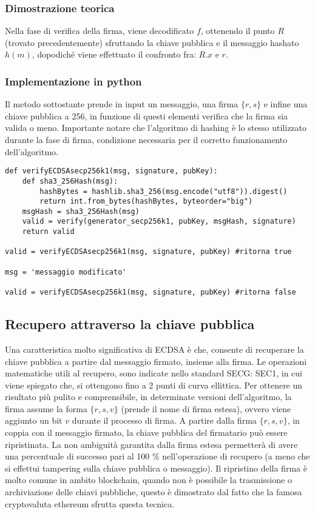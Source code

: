 \subsubsection{Dimostrazione teorica}

Nella fase di verifica della firma, viene decodificato $f$, ottenendo il punto $R$ (trovato precedentemente) sfruttando la chiave pubblica e il messaggio hashato $h(m)$, dopodiché viene effettuato il confronto fra: $R.x$ e $r$. 

\subsubsection{Implementazione in python}

Il metodo sottostante prende in input un messaggio, una firma $\{r, s\}$ e infine una chiave pubblica a 256, in funzione di questi elementi verifica che la firma sia valida o meno. Importante notare che l'algoritmo di hashing è lo stesso utilizzato durante la fase di firma, condizione necessaria per il corretto funzionamento dell'algoritmo.

\begin{lstlisting}
def verifyECDSAsecp256k1(msg, signature, pubKey):
	def sha3_256Hash(msg):
		hashBytes = hashlib.sha3_256(msg.encode("utf8")).digest()
		return int.from_bytes(hashBytes, byteorder="big")
	msgHash = sha3_256Hash(msg)
	valid = verify(generator_secp256k1, pubKey, msgHash, signature)
	return valid
	
valid = verifyECDSAsecp256k1(msg, signature, pubKey) #ritorna true

msg = 'messaggio modificato'

valid = verifyECDSAsecp256k1(msg, signature, pubKey) #ritorna false
\end{lstlisting}

\newpage

\subsection{Recupero attraverso la chiave pubblica}

Una caratteristica molto significativa di ECDSA è che, consente di recuperare la chiave pubblica a partire dal messaggio firmato, insieme alla firma. Le operazioni matematiche utili al recupero, sono indicate nello standard SECG: SEC1, in cui viene spiegato che, si ottengono fino a 2 punti di curva ellittica. Per ottenere un risultato più pulito e comprensibile, in determinate versioni dell'algoritmo, la firma assume la forma $\{r, s, v\}$ (prende il nome di firma estesa), ovvero viene aggiunto un bit $v$ durante il processo di firma. A partire dalla firma $\{r, s, v\}$, in coppia con il messaggio firmato, la chiave pubblica del firmatario può essere ripristinata. La non ambiguità garantita dalla firma estesa permetterà di avere una percentuale di successo pari al 100 $\%$ nell'operazione di recupero (a meno che si effettui tampering sulla chiave pubblica o messaggio). Il ripristino della firma è molto comune in ambito blockchain, quando non è possibile la trasmissione o archiviazione delle chiavi pubbliche, questo è dimostrato dal fatto che la famosa cryptovaluta ethereum sfrutta questa tecnica.

